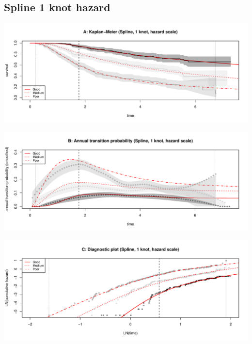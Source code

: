 \documentclass[]{article}
\begin{document}
\newpage 

\subsection{Spline 1 knot hazard}\label{spline-1-knot-hazard}

\begin{flushleft}\includegraphics[height=0.25\textheight]{Images/spline_hazard1-1} \end{flushleft}

\begin{flushleft}\includegraphics[height=0.25\textheight]{Images/spline_hazard1-2} \end{flushleft}

\begin{flushleft}\includegraphics[height=0.25\textheight]{Images/spline_hazard1-3} \end{flushleft}
\end{document}
